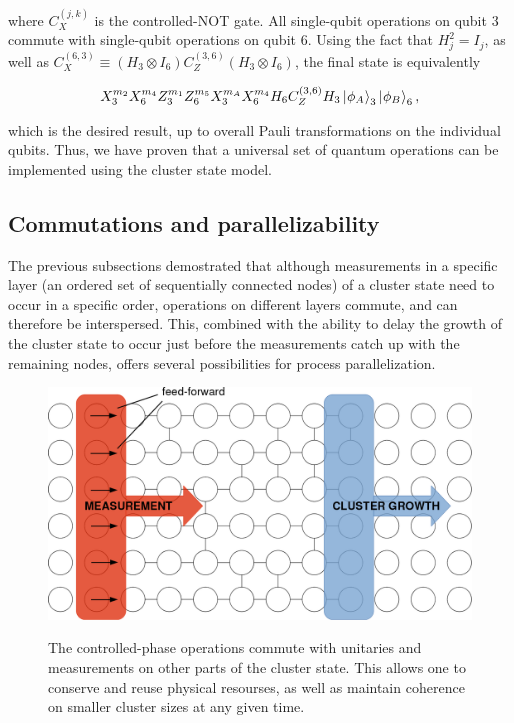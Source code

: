 \documentclass[twocolumn]{Styles/IEEEtran11}
\begin{document}
\noindent where $C_X^{(j,k)}$ is the controlled-NOT gate. All single-qubit operations on qubit $3$ commute with single-qubit operations on qubit $6$. Using the fact that $H_j^2 = I_j$, as well as $C_X^{(6,3)}\equiv (H_3\otimes I_6)C_Z^{(3,6)}(H_3\otimes I_6)$, the final state is equivalently

\begin{gather*}
  X_3^{m_2}X_6^{m_4}Z_3^{m_1}Z_6^{m_5}X_3^{m_A}X_6^{m_4}H_6C_Z^{(3,6)}H_3\left|\mspace{0.5mu} \phi_A \mspace{0.5mu}\right\rangle_3\left|\mspace{0.5mu} \phi_B \mspace{0.5mu}\right\rangle_6,
\end{gather*}

\noindent which is the desired result, up to overall Pauli transformations on the individual qubits. Thus, we have proven that a universal set of quantum operations can be implemented using the cluster state model.

\subsection{Commutations and parallelizability}

The previous subsections demostrated that although measurements in a
specific layer (an ordered set of sequentially connected nodes) of a
cluster state need to occur in a specific order, operations on
different layers commute, and can therefore be interspersed. This,
combined with the ability to delay the growth of the cluster state to
occur just before the measurements catch up with the remaining nodes,
offers several possibilities for process parallelization.

\begin{figure}[thb]
  \centering
  \includegraphics[width=\linewidth]{Images/parallel01.png}
  \label{parallelfig1}
  \caption{The controlled-phase operations commute with unitaries and measurements on other parts of the cluster state. This allows one to conserve and reuse physical resourses, as well as maintain coherence on smaller cluster sizes at any given time.}
\end{figure}
\end{document}
